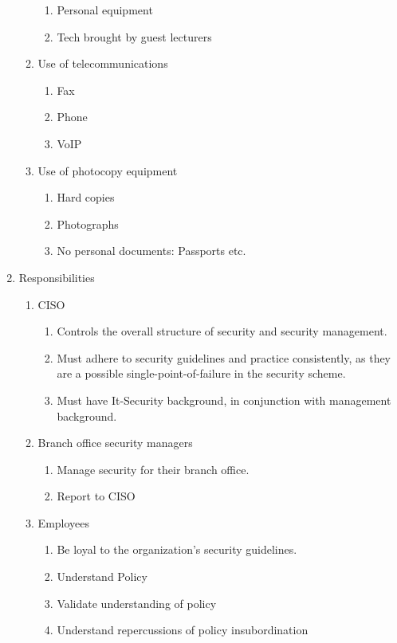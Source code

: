 \begin{enumerate}
\begin{enumerate}
\begin{enumerate}
      \item Personal equipment
      \item Tech brought by guest lecturers
    \end{enumerate}
    \item Use of telecommunications
    \begin{enumerate}
      \item Fax
      \item Phone
      \item VoIP
    \end{enumerate}
    \item Use of photocopy equipment
    \begin{enumerate}
      \item Hard copies
      \item Photographs 
      \item No personal documents: Passports etc.
    \end{enumerate}
  \end{enumerate}
  \item Responsibilities
  \begin{enumerate}
    \item CISO 
    \begin{enumerate}
      \item Controls the overall structure of security and security management.
      \item Must adhere to security guidelines and practice consistently, as they are a possible single-point-of-failure in the security scheme.
      \item Must have It-Security background, in conjunction with management background.
    \end{enumerate}
    \item Branch office security managers
    \begin{enumerate}
       \item Manage security for their branch office.
       \item Report to CISO
    \end{enumerate}
    \item Employees
    \begin{enumerate}
      \item Be loyal to the organization's security guidelines.
      \item Understand Policy
      \item Validate understanding of policy
      \item Understand repercussions of policy insubordination

\end{enumerate}
\end{enumerate}
\end{enumerate}
